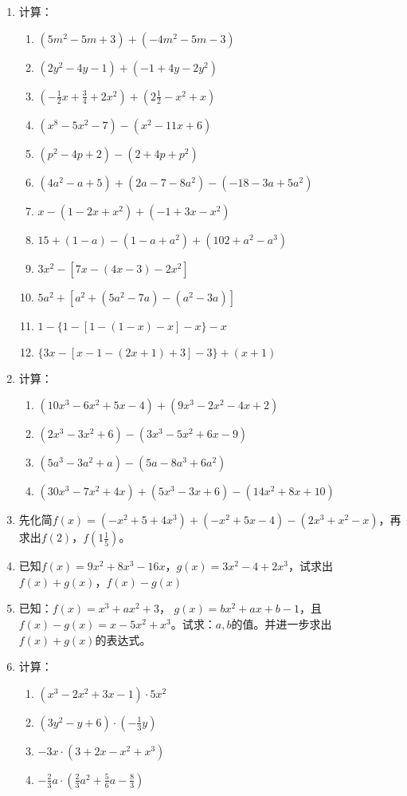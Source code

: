\begin{enumerate}
\item 计算：
\begin{enumerate}
\item 
    $\left(5 m^{2}-5 m+3\right)+\left(-4 m^{2}-5 m-3\right)$
    \item     $\left(2 y^{2}-4 y-1\right)+\left(-1+4 y-2 y^{2}\right)$
    \item     $\left(-\frac{1}{2} x+\frac{3}{4}+2 x^{2}\right)+\left(2 \frac{1}{2}-x^{2}+x\right)$
    \item     $\left(x^{8}-5 x^{2}-7\right)-\left(x^{2}-11 x+6\right)$
    \item     $\left(p^{2}-4 p+2\right)-\left(2+4 p+p^{2}\right)$
    \item     $\left(4 a^{2}-a+5\right)+\left(2 a-7-8 a^{2}\right)-(-18-3 a+5 a^{2})$
    \item     $x-\left(1-2 x+x^{2}\right)+\left(-1+3 x-x^{2}\right)$
    \item    $15+(1-a)-\left(1-a+a^{2}\right)+\left(102+a^{2}-a^{3}\right)$
    \item    $3 x^{2}-\left[7 x-(4 x-3)-2 x^{2}\right]$
    \item   $5a^2+[a^2+(5a^2-7a)-(a^2-3a)]$
    \item $1-\{1-[1-(1-x)-x]-x\}-x$
    \item $\{3x-[x-1-(2x+1)+3]-3\}+(x+1)$
\end{enumerate}

    \item 计算：
    \begin{enumerate}
        \item $\left(10 x^{3}-6 x^{2}+5 x-4\right)+\left(9 x^{3}-2 x^{2}-4 x+2\right)$
        \item $\left(2 x^{3}-3 x^{2}+6\right)-\left(3 x^{3}-5 x^{2}+6 x-9\right)$
        \item $\left(5 a^{3}-3 a^{2}+a\right)-\left(5 a-8 a^{3}+6 a^{2}\right)$
        \item $\left(30 x^{3}-7 x^{2}+4 x\right)+\left(5 x^{3}-3 x+6\right)-(14 x^{2}+8 x+10)$
\end{enumerate}

\item 先化简$f(x)=(-x^2+5+4x^3)+(-x^2+5x-4)-(2x^3+x^2-x)$，再求出$f(2)$，$f\left(1\frac{1}{5}\right)$。
\item 已知$f(x)=9x^2+8x^3-16x$，$g(x)=3x^2-4+2x^3$，试求出$f(x)+g(x)$，$f(x)-g(x)$
\item 已知：$f(x)=x^3+ax^2+3$， $g(x)=bx^2+ax+b-1$，且$f(x)-g(x)=x-5x^2+x^3$。试求：$a,b$的值。并进一步求出$f(x)+g(x)$的表达式。
\item 计算：
\begin{multicols}{2}
\begin{enumerate}
    \item $(x^3-2x^2+3x-1)\cdot 5x^2$
    \item $(3y^2-y+6)\cdot \left(-\frac{1}{3}y\right)$
    \item $-3x\cdot (3+2x-x^2+x^3)$
    \item $-\frac{2}{3}a\cdot \left(\frac{2}{3}a^2+\frac{5}{6}a-\frac{8}{3}\right)$
\end{enumerate}
    \end{multicols}


\end{enumerate}
